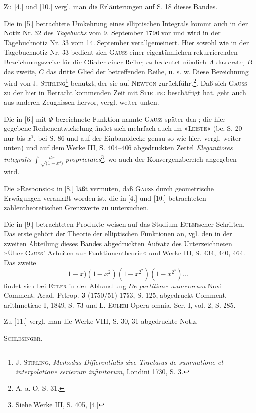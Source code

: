 Zu [4.] und [10.] vergl. man die Erläuterungen auf S. 18 dieses Bandes.

Die in [5.] betrachtete Umkehrung eines elliptischen Integrals kommt auch in der Notiz Nr. 32 des
\textit{Tagebuchs} vom 9. September 1796 vor und wird in der Tagebuchnotiz Nr. 33 vom 14. September verallgemeinert.
Hier sowohl wie in der Tagebuchnotiz Nr. 33 bedient sich \textsc{Gauss} einer eigentümlichen rekurrierenden
Bezeichnungsweise für die Glieder einer Reihe; es bedeutet nämlich $A$ das erste, $B$ das zweite, $C$ das dritte
Glied der betreffenden Reihe, u. s. w. Diese Bezeichnung wird von J. \textsc{Stirling}\renewcommand{\thefootnote}{**)}\footnote{J. \textsc{Stirling},
\textit{Methodus Differentialis sive Tractatus de summatione et interpolatione serierum infinitarum}, Londini 1730, S. 3.}
benutzt, der sie auf \textsc{Newton} zurückführt\renewcommand{\thefootnote}{***)}\footnote{A. a. O. S. 31.}.
Daß sich \textsc{Gauss} zu der hier in Betracht kommenden Zeit mit \textsc{Stirling} beschäftigt hat, geht auch aus anderen Zeugnissen hervor, vergl. weiter unten.

Die in [6.] mit $\Phi$ bezeichnete Funktion nannte \textsc{Gauss} später den ; die hier
gegebene Reihenentwickelung findet sich mehrfach auch im »\textsc{Leiste}« (bei S. 20 nur bis $x^9$, bei S. 86 und
auf der Einbanddecke genau so wie hier, vergl. weiter unten) und auf dem Werke III, S. 404--406 abgedruckten
Zettel \textit{Elegantiores integralis $\displaystyle\int\frac{dx}{\surd(1-x^4)}$ proprietates}\renewcommand{\thefootnote}{$\dagger$)}\footnote{Siehe Werke III, S. 405, [4.]},
wo auch der Konvergenzbereich angegeben wird.

Die »Responsio« in [8.] läßt vermuten, daß \textsc{Gauss} durch geometrische Erwägungen veranlaßt worden
ist, die in [4.] und [10.] betrachteten zahlentheoretischen Grenzwerte zu untersuchen.

Die in [9.] betrachteten Produkte weisen auf das Studium \textsc{Euler}scher Schriften. Das erste gehört
der Theorie der elliptischen Funktionen an, vgl. den in der zweiten Abteilung dieses Bandes abgedruckten
Aufsatz des Unterzeichneten »Über \textsc{Gauss}’ Arbeiten zur Funktionentheorie« und Werke III, S. 434, 440, 464.
Das zweite
\[1-x)(1-x^2)(1-x^{2^2})(1-x^{2^3})\ldots\]
\noindent findet sich bei \textsc{Euler} in der Abhandlung \textit{De partitione numerorum} Novi Comment. Acad. Petrop. \textbf{3} (1750/51)
1753, S. 125, abgedruckt Comment. arithmeticae I, 1849, S. 73 und L. \textsc{Euleri} Opera omnia, Ser. I, vol. 2,
S. 285.

Zu [11.] vergl. man die Werke VIII, S. 30, 31 abgedruckte Notiz.
\par\noindent\hfill\textsc{Schlesinger}.\par
\ClosingRule
\clearpage
\endgroup
